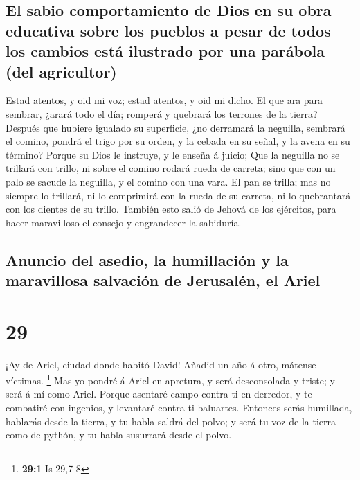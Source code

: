 \hypertarget{el-sabio-comportamiento-de-dios-en-su-obra-educativa-sobre-los-pueblos-a-pesar-de-todos-los-cambios-estuxe1-ilustrado-por-una-paruxe1bola-del-agricultor}{%
\subsection{El sabio comportamiento de Dios en su obra educativa sobre
los pueblos a pesar de todos los cambios está ilustrado por una parábola
(del
agricultor)}\label{el-sabio-comportamiento-de-dios-en-su-obra-educativa-sobre-los-pueblos-a-pesar-de-todos-los-cambios-estuxe1-ilustrado-por-una-paruxe1bola-del-agricultor}}

 Estad atentos, y oid mi voz; estad atentos, y oid mi
dicho.  El que ara para sembrar, ¿arará todo el día;
romperá y quebrará los terrones de la tierra?  Después que
hubiere igualado su superficie, ¿no derramará la neguilla, sembrará el
comino, pondrá el trigo por su orden, y la cebada en su señal, y la
avena en su término?  Porque su Dios le instruye, y le
enseña á juicio;  Que la neguilla no se trillará con
trillo, ni sobre el comino rodará rueda de carreta; sino que con un palo
se sacude la neguilla, y el comino con una vara.  El pan se
trilla; mas no siempre lo trillará, ni lo comprimirá con la rueda de su
carreta, ni lo quebrantará con los dientes de su trillo. 
También esto salió de Jehová de los ejércitos, para hacer maravilloso el
consejo y engrandecer la sabiduría.

\hypertarget{anuncio-del-asedio-la-humillaciuxf3n-y-la-maravillosa-salvaciuxf3n-de-jerusaluxe9n-el-ariel}{%
\subsection{Anuncio del asedio, la humillación y la maravillosa
salvación de Jerusalén, el
Ariel}\label{anuncio-del-asedio-la-humillaciuxf3n-y-la-maravillosa-salvaciuxf3n-de-jerusaluxe9n-el-ariel}}

\hypertarget{section-28}{%
\section{29}\label{section-28}}

 ¡Ay de Ariel, ciudad donde habitó David! Añadid un año á
otro, mátense víctimas. \footnote{\textbf{29:1} Is 29,7-8} 
Mas yo pondré á Ariel en apretura, y será desconsolada y triste; y será
á mí como Ariel.  Porque asentaré campo contra ti en
derredor, y te combatiré con ingenios, y levantaré contra ti baluartes.
 Entonces serás humillada, hablarás desde la tierra, y tu
habla saldrá del polvo; y será tu voz de la tierra como de pythón, y tu
habla susurrará desde el polvo.

